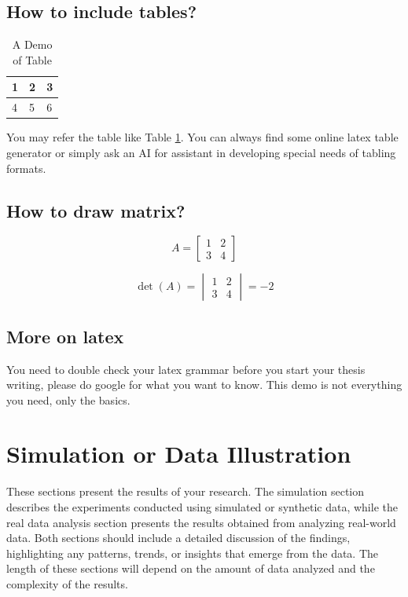 \documentclass[openany]{book}
\numberwithin{figure}{chapter}
\numberwithin{equation}{chapter}
\begin{document}
\section{How to include tables?}
\begin{table}[H]
\begin{tabular}{|l|l|l|}
\hline
1 & 2 & 3 \\ \hline
4 & 5 & 6 \\ \hline
\end{tabular}
\caption{A Demo of Table}
\label{table.1}
\end{table}
You may refer the table like  Table \ref{table.1}. You can always find some online latex table generator or simply ask an AI for assistant in developing special needs of tabling formats.

\section{How to draw matrix?}

\begin{equation}
    A=\begin{bmatrix}
        1 & 2 \\
        3 & 4
    \end{bmatrix}
\end{equation}

\begin{equation}
    \det(A)=\begin{vmatrix}
        1 & 2 \\
        3 & 4
    \end{vmatrix}=-2
\end{equation}
\section{More on latex}

You need to double check your latex grammar before you start your thesis writing, please do google for what you want to know. This demo is not everything you need, only the basics.

\chapter{Simulation or Data Illustration}
These sections present the results of your research. The simulation section describes the experiments conducted using simulated or synthetic data, while the real data analysis section presents the results obtained from analyzing real-world data. Both sections should include a detailed discussion of the findings, highlighting any patterns, trends, or insights that emerge from the data. The length of these sections will depend on the amount of data analyzed and the complexity of the results.
\end{document}
